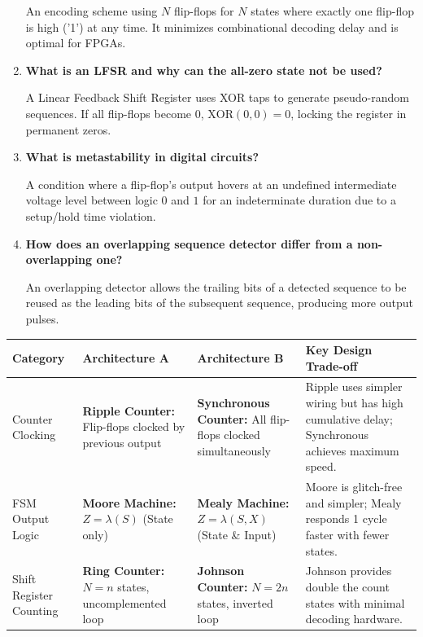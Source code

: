 \documentclass[12pt,a4paper]{article}
\newcommand{\Q}[1]{\textbf{#1}\par\noindent\ignorespaces}
\renewcommand{\arraystretch}{1.45}
\begin{document}
\begin{tcolorbox}[exambox, title={\textbf{Frequently Asked / Viva Questions}}]
\begin{enumerate}[topsep=0pt, label=\textbf{Q\arabic*.}, itemsep=5pt]
    An encoding scheme using $N$ flip-flops for $N$ states where exactly one flip-flop is high ('1') at any time. It minimizes combinational decoding delay and is optimal for FPGAs.
  \item \Q{What is an LFSR and why can the all-zero state not be used?}
    A Linear Feedback Shift Register uses XOR taps to generate pseudo-random sequences. If all flip-flops become $0$, $\text{XOR}(0,0)=0$, locking the register in permanent zeros.
  \item \Q{What is metastability in digital circuits?}
    A condition where a flip-flop's output hovers at an undefined intermediate voltage level between logic $0$ and $1$ for an indeterminate duration due to a setup/hold time violation.
  \item \Q{How does an overlapping sequence detector differ from a non-overlapping one?}
    An overlapping detector allows the trailing bits of a detected sequence to be reused as the leading bits of the subsequent sequence, producing more output pulses.
\end{enumerate}
\end{tcolorbox}

\begin{tcolorbox}[tikzbox, title={Comparison: Ripple vs. Synchronous Counters and Mealy vs. Moore FSM}]
\centering
\begingroup
\footnotesize
\setlength{\tabcolsep}{3.5pt}
\setlength{\extrarowheight}{2.5pt}
\renewcommand{\arraystretch}{1.35}
\begin{tabularx}{\linewidth}{|B{2.2cm}|Y|Y|Y|}
\hline
\textbf{Category} & \textbf{Architecture A} & \textbf{Architecture B} & \textbf{Key Design Trade-off} \\
\hline
Counter Clocking & \textbf{Ripple Counter:} Flip-flops clocked by previous output & \textbf{Synchronous Counter:} All flip-flops clocked simultaneously & Ripple uses simpler wiring but has high cumulative delay; Synchronous achieves maximum speed. \\
\hline
FSM Output Logic & \textbf{Moore Machine:} $Z = \lambda(S)$ (State only) & \textbf{Mealy Machine:} $Z = \lambda(S, X)$ (State \& Input) & Moore is glitch-free and simpler; Mealy responds 1 cycle faster with fewer states. \\
\hline
Shift Register Counting & \textbf{Ring Counter:} $N = n$ states, uncomplemented loop & \textbf{Johnson Counter:} $N = 2n$ states, inverted loop & Johnson provides double the count states with minimal decoding hardware. \\
\hline
\end{tabularx}
\endgroup
\end{tcolorbox}
\end{document}
